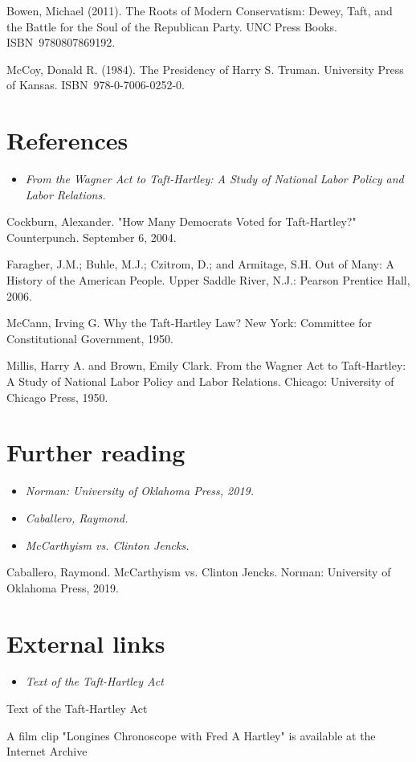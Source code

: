 Bowen, Michael (2011). The Roots of Modern Conservatism: Dewey, Taft,
and the Battle for the Soul of the Republican Party. UNC Press Books.
ISBN~9780807869192.

McCoy, Donald R. (1984). The Presidency of Harry S. Truman. University
Press of Kansas. ISBN~978-0-7006-0252-0.

\section{References}\label{references}

\begin{itemize}
\item
  \emph{From the Wagner Act to Taft-Hartley: A Study of National Labor
  Policy and Labor Relations.}
\end{itemize}

Cockburn, Alexander. "How Many Democrats Voted for Taft-Hartley?"
Counterpunch. September 6, 2004.

Faragher, J.M.; Buhle, M.J.; Czitrom, D.; and Armitage, S.H. Out of
Many: A History of the American People. Upper Saddle River, N.J.:
Pearson Prentice Hall, 2006.

McCann, Irving G. Why the Taft-Hartley Law? New York: Committee for
Constitutional Government, 1950.

Millis, Harry A. and Brown, Emily Clark. From the Wagner Act to
Taft-Hartley: A Study of National Labor Policy and Labor Relations.
Chicago: University of Chicago Press, 1950.

\section{Further reading}\label{further-reading}

\begin{itemize}
\item
  \emph{Norman: University of Oklahoma Press, 2019.}
\item
  \emph{Caballero, Raymond.}
\item
  \emph{McCarthyism vs. Clinton Jencks.}
\end{itemize}

Caballero, Raymond. McCarthyism vs. Clinton Jencks. Norman: University
of Oklahoma Press, 2019.

\section{External links}\label{external-links}

\begin{itemize}
\item
  \emph{Text of the Taft-Hartley Act}
\end{itemize}

Text of the Taft-Hartley Act

A film clip "Longines Chronoscope with Fred A Hartley" is available at
the Internet Archive
